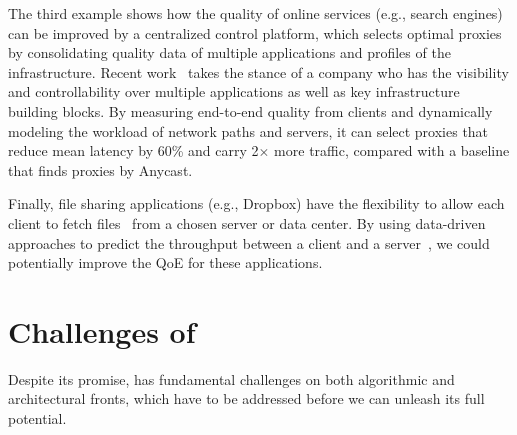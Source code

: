 The third example shows how the quality of online services 
(e.g., search engines) can be improved by a centralized 
control platform, which selects optimal proxies by consolidating
quality data of multiple applications and profiles of the infrastructure.
Recent work~\cite{footprint} takes the stance of a company who 
has the visibility and controllability over multiple applications as 
well as key infrastructure building blocks. 
By measuring end-to-end quality from clients and dynamically 
modeling the workload of network paths and servers, it can 
select proxies that reduce mean latency by 60\% and carry 2$\times$ 
more traffic, compared with a baseline that finds proxies by Anycast.

Finally, file sharing applications (e.g., Dropbox) have
the flexibility to allow each client to fetch files~\cite{drago2012inside} 
from a chosen server or data center.  By using data-driven 
 approaches to predict the throughput between a client and
a server~\cite{cs2p,spand,zhang2001constancy}, we could 
potentially improve the QoE for these applications.








\section{Challenges of \ddn}
\label{sec:overview:challenges}

Despite its promise, \ddn has fundamental challenges on both
algorithmic and architectural fronts, which have to be addressed 
before we can unleash its full potential.



